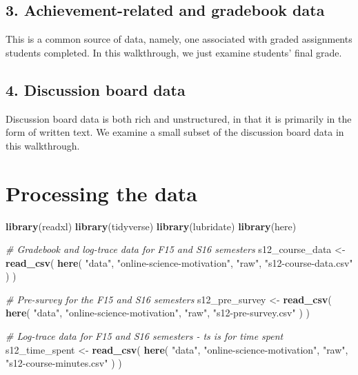 \documentclass[]{book}
\newenvironment{Shaded}{\begin{snugshade}}{\end{snugshade}}
\newcommand{\KeywordTok}[1]{\textcolor[rgb]{0.13,0.29,0.53}{\textbf{#1}}}
\newcommand{\StringTok}[1]{\textcolor[rgb]{0.31,0.60,0.02}{#1}}
\newcommand{\CommentTok}[1]{\textcolor[rgb]{0.56,0.35,0.01}{\textit{#1}}}
\newcommand{\NormalTok}[1]{#1}
\begin{document}
\section{3. Achievement-related and gradebook
data}\label{achievement-related-and-gradebook-data}

This is a common source of data, namely, one associated with graded
assignments students completed. In this walkthrough, we just examine
students' final grade.

\section{4. Discussion board data}\label{discussion-board-data}

Discussion board data is both rich and unstructured, in that it is
primarily in the form of written text. We examine a small subset of the
discussion board data in this walkthrough.

\chapter{Processing the data}\label{processing-the-data}

\begin{Shaded}
\begin{Highlighting}[]
\KeywordTok{library}\NormalTok{(readxl)}
\KeywordTok{library}\NormalTok{(tidyverse)}
\KeywordTok{library}\NormalTok{(lubridate)}
\KeywordTok{library}\NormalTok{(here)}
\end{Highlighting}
\end{Shaded}

\begin{Shaded}
\begin{Highlighting}[]
\CommentTok{# Gradebook and log-trace data for F15 and S16 semesters}
\NormalTok{s12_course_data <-}\StringTok{ }\KeywordTok{read_csv}\NormalTok{(}
  \KeywordTok{here}\NormalTok{(}
    \StringTok{"data"}\NormalTok{, }
    \StringTok{"online-science-motivation"}\NormalTok{, }
    \StringTok{"raw"}\NormalTok{, }
    \StringTok{"s12-course-data.csv"}
\NormalTok{  )}
\NormalTok{)}

\CommentTok{# Pre-survey for the F15 and S16 semesters}
\NormalTok{s12_pre_survey  <-}\StringTok{ }\KeywordTok{read_csv}\NormalTok{(}
  \KeywordTok{here}\NormalTok{(}
    \StringTok{"data"}\NormalTok{, }
    \StringTok{"online-science-motivation"}\NormalTok{, }
    \StringTok{"raw"}\NormalTok{, }
    \StringTok{"s12-pre-survey.csv"}
\NormalTok{  )}
\NormalTok{) }

\CommentTok{# Log-trace data for F15 and S16 semesters - ts is for time spent}
\NormalTok{s12_time_spent <-}\StringTok{ }\KeywordTok{read_csv}\NormalTok{(}
  \KeywordTok{here}\NormalTok{(}
    \StringTok{"data"}\NormalTok{, }
    \StringTok{"online-science-motivation"}\NormalTok{, }
    \StringTok{"raw"}\NormalTok{, }
    \StringTok{"s12-course-minutes.csv"}
\NormalTok{  )}
\NormalTok{)}
\end{Highlighting}
\end{Shaded}
\end{document}
